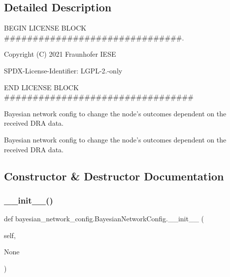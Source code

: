 \subsection{Detailed Description}
B\+E\+G\+IN L\+I\+C\+E\+N\+SE B\+L\+O\+CK \#\#\#\#\#\#\#\#\#\#\#\#\#\#\#\#\#\#\#\#\#\#\#\#\#\#\#\#\#\#\#. 

Copyright (C) 2021 Fraunhofer I\+E\+SE

S\+P\+D\+X-\/\+License-\/\+Identifier\+: L\+G\+P\+L-\/2.-\/only

E\+ND L\+I\+C\+E\+N\+SE B\+L\+O\+CK \#\#\#\#\#\#\#\#\#\#\#\#\#\#\#\#\#\#\#\#\#\#\#\#\#\#\#\#\#\#\#\#\# \begin{DoxyVerb}Bayesian network config to change the node's outcomes dependent
on the received DRA data.
\end{DoxyVerb}


\begin{DoxyVerb}Bayesian network config to change the node's outcomes dependent
on the received DRA data.
\end{DoxyVerb}
 

\subsection{Constructor \& Destructor Documentation}
\mbox{\label{classbayesian__network__config_1_1_bayesian_network_config_aeee7107b8b3f2b2cd42c3d57fb4235c3}} 
\subsubsection{\texorpdfstring{\+\_\+\+\_\+init\+\_\+\+\_\+()}{\_\_init\_\_()}\hspace{0.1cm}{\footnotesize\ttfamily [1/3]}}
{\footnotesize\ttfamily def bayesian\+\_\+network\+\_\+config.\+Bayesian\+Network\+Config.\+\_\+\+\_\+init\+\_\+\+\_\+ (\begin{DoxyParamCaption}\item[{}]{self,  }\item[{}]{None }\end{DoxyParamCaption})}


